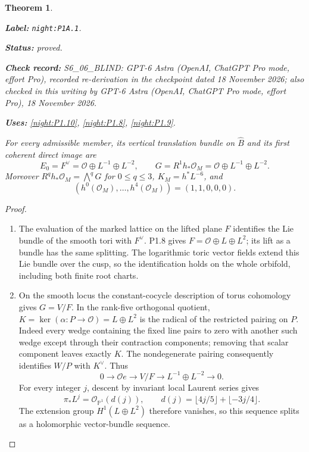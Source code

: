 \documentclass[11pt,a4paper]{article}
\newtheorem{theorem}{Theorem}[section]
\theoremstyle{definition}
\newcommand{\StatementRecord}[4]{\par\smallskip\begingroup\upshape\raggedright\noindent\textbf{Label:} \nolinkurl{#1}.\par\noindent\textbf{Status:} #2.\par\noindent\textbf{Check record:} #3.\par\noindent\textbf{Uses:} #4.\par\endgroup\smallskip}
\newcommand{\CurrentChecker}{GPT-6 Astra (OpenAI, ChatGPT Pro mode, effort Pro), 18 November 2026}
\begin{document}
\begin{theorem}\label{night:P1A.1}
\StatementRecord{night:P1A.1}{proved}{S6\_06\_BLIND: GPT-6 Astra (OpenAI, ChatGPT Pro mode, effort Pro), recorded re-derivation in the checkpoint dated 18 November 2026; also checked in this writing by \CurrentChecker}{\cref{night:P1.10}, \cref{night:P1.8}, \cref{night:P1.9}}
For every admissible member, its vertical translation bundle on
$\widehat B$ and its first coherent direct image are
\[
 E_0=F^\vee=\mathcal O\oplus L^{-1}\oplus L^{-2},\qquad
 G=R^1h_*\mathcal O_M=\mathcal O\oplus L^{-1}\oplus L^{-2}.
\]
Moreover $R^qh_*\mathcal O_M=\bigwedge^qG$ for $0\le q\le3$,
$K_M=h^*L^{-6}$, and
\[
 (h^0(\mathcal O_M),\ldots,h^4(\mathcal O_M))=(1,1,0,0,0).
\]
\end{theorem}
\begin{proof}
\begin{enumerate}[label=\arabic*.]
\item The evaluation of the marked lattice on the lifted plane $F$
identifies the Lie bundle of the smooth tori with $F^\vee$.
P1.8 gives $F=\mathcal O\oplus L\oplus L^2$; its lift as a bundle
has the same splitting. The logarithmic toric vector fields extend
this Lie bundle over the cusp, so the identification holds on the
whole orbifold, including both finite root charts.

\item On the smooth locus the constant-cocycle description of torus
cohomology gives $G=V/F$. In the rank-five orthogonal quotient,
$K=\ker(\alpha:P\to\mathcal O)=L\oplus L^2$ is the radical of
the restricted pairing on $P$. Indeed every wedge containing the
fixed line pairs to zero with another such wedge except through
their contraction components; removing that scalar component
leaves exactly $K$. The nondegenerate pairing consequently
identifies $W/P$ with $K^\vee$. Thus
\[
 0\longrightarrow\mathcal O e\longrightarrow V/F
   \longrightarrow L^{-1}\oplus L^{-2}\longrightarrow0.
\]
For every integer $j$, descent by invariant local Laurent series gives
\begin{equation}\label{eq:P1Adegree}
 \pi_*L^j=\mathcal O_{\mathbb P^1}(d(j)),\qquad
 d(j)=\lfloor4j/5\rfloor+\lfloor-3j/4\rfloor.
\end{equation}
The extension group $H^1(L\oplus L^2)$ therefore vanishes, so this
sequence splits as a holomorphic vector-bundle sequence.


\end{enumerate}
\end{proof}
\end{document}
